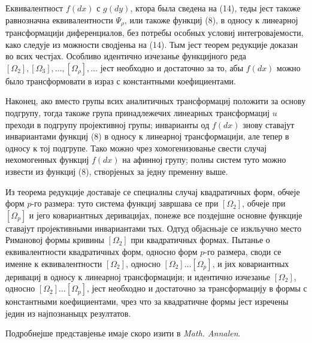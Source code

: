 ﻿\documentclass[11pt]{article}
\begin{document}
Еквивалентност \(f(dx)\) с \(g(dy)\), ктора была сведена на (14), теды јест такоже равнозначна еквивалентности \(\Psi_\rho\), или такоже функциј (8), в односу к линеарној трансформацији диференциалов, без потребы особных условиј интегровајемости, како следује из можности сводјеньа на (14). Тым јест теорем редукције доказан во всих честјах. Особливо идентично изчезанье функцијного реда \([\Omega_2],[\Omega_3],\ldots,[\Omega_\rho],\ldots\) јест необходно и достаточно за то, абы \(f(dx)\) можно было трансформовати в израз с константными коефициентами.

Наконец, ако вместо групы всих аналитичных трансформациј положити за основу подгрупу, тогда такоже група принадлежечих линеарных трансформациј \(u\) преходи в подгрупу пројективној групы; инварианты од \(f(dx)\) знову ставајут инвариантами функциј (8) в односу к линеарној трансформацији, але тепер в односу к тој подгрупе. Тако можно чрез хомогенизованье свести случај нехомогенных функциј \(f(dx)\) на афинној групу; полны систем туто можно извести из функциј (8), створјеных за једну пременну выше.

Из теорема редукције доставаје се специалны случај квадратичных форм, обчеје форм \(p\)-го размера: туто система функциј завршава се при \([\Omega_2]\), обчеје при \([\Omega_p]\) и јего ковариантных деривацијах, понеже все поздејшне основне функције ставајут пројективными инвариантами тых. Одтуд објасньаје се изкльучно место Римановој формы кривины \([\Omega_2]\) при квадратичных формах. Пытанье о еквивалентности квадратичных форм, односно форм \(p\)-го размера, своди се именне к еквивалентности \([\Omega_2]\), односно \([\Omega_2]\ldots[\Omega_p]\), и јих ковариантных деривациј в односу к линеарној трансформацији; и идентично изчезанье \([\Omega_2]\), односно \([\Omega_2]\ldots[\Omega_p]\), јест необходно и достаточно за трансформацију в формы с константными коефициентами, чрез что за квадратичне формы јест изречены једин из најпознаныцх резултатов.

Подробнејше представјенье имаје скоро изити в \emph{Math. Annalen}.

\clearpage
\end{document}

